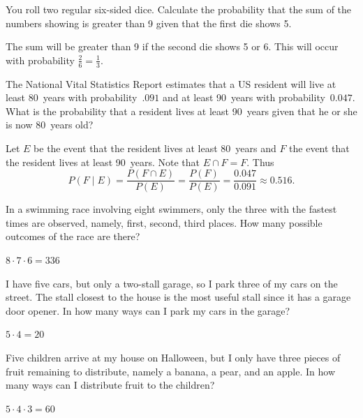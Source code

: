 \documentclass[12pt]{exam}
\begin{document}
\begin{questions}
\question You roll two regular six-sided dice. Calculate the probability
that the sum of the numbers showing is greater than 9 given that
the first die shows 5.
\begin{solution} The sum will be greater than 9 if the second die
shows 5 or 6.
This will occur with probability $\frac{2}{6}=\frac{1}{3}$.
\end{solution}

\question The National Vital Statistics Report estimates
that a US resident will live at least 80~years with probability~$.091$
and at least 90~years with probability~$0.047$.
What is the probability that a resident lives at least 90~years
given that he or she is now 80~years old?
\begin{solution}
Let $E$ be the event that the resident lives at least 80~years
and $F$ the event that the resident lives at least 90~years.
Note that $E\cap F=F$. Thus
\[P\left(F\mid E\right)
=\frac{P\left(F\cap E\right)}{P\left(E\right)}
=\frac{P\left(F\right)}{P\left(E\right)}
=\frac{0.047}{0.091}\approx 0.516.\]
\end{solution}

\question In a swimming race involving eight swimmers, only the three
with the fastest times are observed,
namely, first, second, third places.
How many possible outcomes of the race are there?
\begin{solution} $8\cdot 7\cdot 6=336$ \end{solution}

\question I have five cars, but only a two-stall garage, so I
park three of my cars on the street. 
The stall closest to the house is the most useful stall since
it has a garage door opener. In how many
ways can I park my cars in the garage?
\begin{solution}$5\cdot 4=20$\end{solution}

\question Five children arrive at my house on Halloween,
but I only have three pieces of fruit remaining to distribute, namely
a banana, a pear, and an apple. In how many ways can I distribute
fruit to the children?
\begin{solution} $5\cdot 4\cdot 3=60$\end{solution}

\question
{}
\end{questions}
\end{document}
